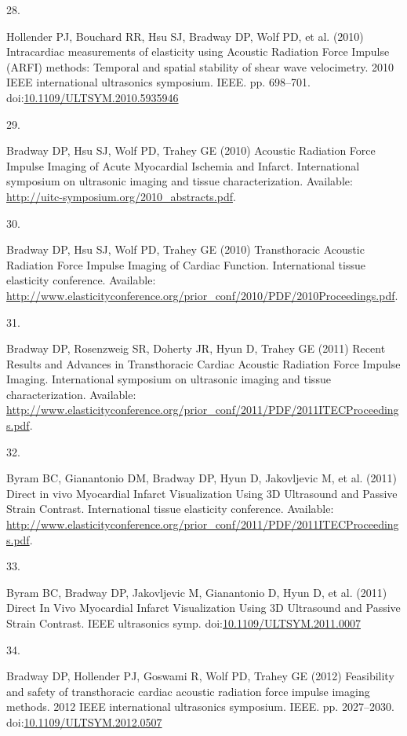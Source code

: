 \documentclass[
]{article}
\newlength{\cslhangindent}
\newlength{\csllabelwidth}
\newenvironment{CSLReferences}[2] %
 {\begin{list}{}{%
  \setlength{\itemindent}{0pt}
  \setlength{\leftmargin}{0pt}
  \setlength{\parsep}{0pt}
  \ifodd #1
   \setlength{\leftmargin}{\cslhangindent}
   \setlength{\itemindent}{-1\cslhangindent}
  \fi
  \setlength{\itemsep}{#2\baselineskip}}}
 {\end{list}}
\newcommand{\CSLLeftMargin}[1]{\parbox[t]{\csllabelwidth}{\strut#1\strut}}
\newcommand{\CSLRightInline}[1]{\parbox[t]{\linewidth - \csllabelwidth}{\strut#1\strut}}
\begin{document}
\begin{CSLReferences}{0}{1}
\CSLLeftMargin{28. }%
\CSLRightInline{Hollender PJ, Bouchard RR, Hsu SJ, Bradway DP, Wolf PD,
et al. (2010) {Intracardiac measurements of elasticity using Acoustic
Radiation Force Impulse (ARFI) methods: Temporal and spatial stability
of shear wave velocimetry}. 2010 IEEE international ultrasonics
symposium. IEEE. pp. 698--701.
doi:\href{https://doi.org/10.1109/ULTSYM.2010.5935946}{10.1109/ULTSYM.2010.5935946}}

\CSLLeftMargin{29. }%
\CSLRightInline{Bradway DP, Hsu SJ, Wolf PD, Trahey GE (2010) {Acoustic
Radiation Force Impulse Imaging of Acute Myocardial Ischemia and
Infarct}. International symposium on ultrasonic imaging and tissue
characterization. Available:
\url{http://uitc-symposium.org/2010_abstracts.pdf}.}

\CSLLeftMargin{30. }%
\CSLRightInline{Bradway DP, Hsu SJ, Wolf PD, Trahey GE (2010)
{Transthoracic Acoustic Radiation Force Impulse Imaging of Cardiac
Function}. International tissue elasticity conference. Available:
\url{http://www.elasticityconference.org/prior_conf/2010/PDF/2010Proceedings.pdf}.}

\CSLLeftMargin{31. }%
\CSLRightInline{Bradway DP, Rosenzweig SR, Doherty JR, Hyun D, Trahey GE
(2011) {Recent Results and Advances in Transthoracic Cardiac Acoustic
Radiation Force Impulse Imaging}. International symposium on ultrasonic
imaging and tissue characterization. Available:
\url{http://www.elasticityconference.org/prior_conf/2011/PDF/2011ITECProceedings.pdf}.}

\CSLLeftMargin{32. }%
\CSLRightInline{Byram BC, Gianantonio DM, Bradway DP, Hyun D,
Jakovljevic M, et al. (2011) {Direct in vivo Myocardial Infarct
Visualization Using 3D Ultrasound and Passive Strain Contrast}.
International tissue elasticity conference. Available:
\url{http://www.elasticityconference.org/prior_conf/2011/PDF/2011ITECProceedings.pdf}.}

\CSLLeftMargin{33. }%
\CSLRightInline{Byram BC, Bradway DP, Jakovljevic M, Gianantonio D, Hyun
D, et al. (2011) {Direct In Vivo Myocardial Infarct Visualization Using
3D Ultrasound and Passive Strain Contrast}. IEEE ultrasonics symp.
doi:\href{https://doi.org/10.1109/ULTSYM.2011.0007}{10.1109/ULTSYM.2011.0007}}

\CSLLeftMargin{34. }%
\CSLRightInline{Bradway DP, Hollender PJ, Goswami R, Wolf PD, Trahey GE
(2012) Feasibility and safety of transthoracic cardiac acoustic
radiation force impulse imaging methods. 2012 IEEE international
ultrasonics symposium. IEEE. pp. 2027--2030.
doi:\href{https://doi.org/10.1109/ULTSYM.2012.0507}{10.1109/ULTSYM.2012.0507}}


\end{CSLReferences}
\end{document}
